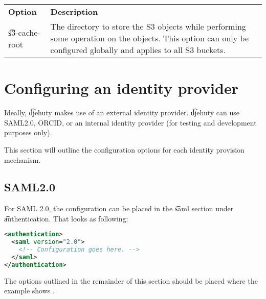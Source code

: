 \begin{tabularx}{\textwidth}{*{1}{!{\VRule[-1pt]}l}!{\VRule[-1pt]}X}
  \headrow
  \textbf{Option}             & \textbf{Description}\\
  \t{s3-cache-root}           & The directory to store the S3 objects
                                while performing some operation on the
                                objects.  This option can only be configured
                                globally and applies to all S3 buckets.
\end{tabularx}

\section{Configuring an identity provider}

  Ideally, \t{djehuty} makes use of an external identity provider.
  \t{djehuty} can use SAML2.0, ORCID, or an internal identity provider
  (for testing and development purposes only).

  This section will outline the configuration options for each
  identity provision mechanism.

\subsection {SAML2.0}

  For SAML 2.0, the configuration can be placed in the \t{saml}
  section under \t{authentication}.  That looks as following:

\begin{lstlisting}[language=xml]
<authentication>
  <saml version="2.0">
    <!-- Configuration goes here. -->
  </saml>
</authentication>
\end{lstlisting}

  The options outlined in the remainder of this section should be placed
  where the example shows .

